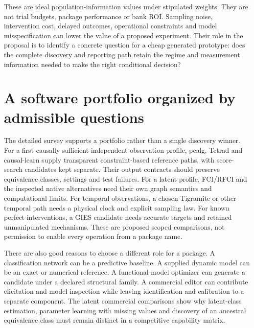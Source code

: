 These are ideal population-information values under stipulated weights.
They are not trial budgets, package performance or bank ROI. Sampling noise,
intervention cost, delayed outcomes, operational constraints and model
misspecification can lower the value of a proposed experiment. Their role in
the proposal is to identify a concrete question for a cheap generated
prototype: does the complete discovery and reporting path retain the regime
and measurement information needed to make the right conditional decision?

\section{A software portfolio organized by admissible questions}

The detailed survey supports a portfolio rather than a single discovery
winner. For a first causally sufficient independent-observation profile,
pcalg, Tetrad and causal-learn supply transparent constraint-based reference
paths, with score-search candidates kept separate. Their output contracts
should preserve equivalence classes, settings and test failures. For a latent
profile, FCI/RFCI and the inspected native alternatives need their own graph
semantics and computational limits. For temporal observations, a chosen
Tigramite or other temporal path needs a physical clock and explicit sampling
law. For known perfect interventions, a GIES candidate needs accurate targets
and retained unmanipulated mechanisms. These are proposed scoped comparisons,
not permission to enable every operation from a package name.
\citep{exec13_pcalg,exec13_java_tetrad,exec13_pydisc_causallearn,exec13_latentr_primary,exec14_pt_tigramite,exec16_ct_pcalg}

There are also good reasons to choose a different role for a package. A
classification network can be a predictive baseline. A supplied dynamic model
can be an exact or numerical reference. A functional-model optimizer can
generate a candidate under a declared structural family. A commercial editor
can contribute elicitation and model inspection while leaving identification
and calibration to a separate component. The latent commercial comparisons
show why latent-class estimation, parameter learning with missing values and
discovery of an ancestral equivalence class must remain distinct in a
competitive capability matrix. \citep{exec13_java_weka,exec16_ct_agrum,exec16_ct_mocapy,exec13_latent_genie_structure,exec13_latent_mplus}


